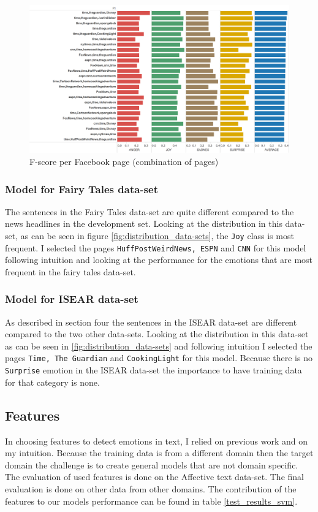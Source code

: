 \documentclass[
10pt, %
a4paper, %
oneside, %
headinclude,footinclude, %
BCOR5mm, %
]{scrartcl}
\begin{document}
\begin{figure}[htb]
  \includegraphics[width=\linewidth]{3datasets.png}
  \caption{F-score per Facebook page (combination of pages)}
  \label{fig:datasets_facebook}
\end{figure}

\subsubsection{Model for Fairy Tales data-set}
The sentences in the Fairy Tales data-set are quite different compared to the news headlines in the development set. Looking at the distribution in this data-set, as can be seen in figure \ref{fig:distribution_data-sets}, the \texttt{Joy} class is most frequent. I selected the pages \texttt{HuffPostWeirdNews, ESPN} and \texttt{CNN} for this model following intuition and looking at the performance for the emotions that are most frequent in the fairy tales data-set.

\subsubsection{Model for ISEAR data-set}
As described in section four the sentences in the ISEAR data-set are different compared to the two other data-sets. Looking at the distribution in this data-set as can be seen in \ref{fig:distribution_data-sets} and following intuition I selected the pages \texttt{Time, The Guardian} and \texttt{CookingLight} for this model. Because there is no \texttt{Surprise} emotion in the ISEAR data-set the importance to have training data for that category is none.

\subsection{Features}
In choosing features to detect emotions in text, I relied on previous work and on my intuition. Because the training data is from a different domain then the target domain the challenge is to create general models that are not domain specific. The evaluation of used features is done on the Affective text data-set. The final evaluation is done on other data from other domains. The contribution of the features to our models performance can be found in table \ref{test_results_svm}.
\end{document}

